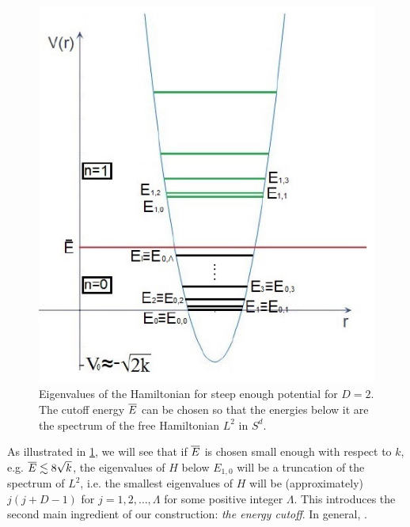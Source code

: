 \begin{figure}[h]
    \centering
    \includegraphics[width = \textwidth/2]{images/FioreEigenvalues.PNG}
    \caption{Eigenvalues of the Hamiltonian for steep enough potential for $D = 2$. The cutoff energy $\overline{E}$ can be chosen so that the energies below it are the spectrum of the free Hamiltonian $L^2$ in $S^d$.}
    \label{fig:D2EigenvaluesEigenEnergiesHarmonicCutoff}
\end{figure}

As illustrated in \ref{fig:D2EigenvaluesEigenEnergiesHarmonicCutoff}, we will see that if $\overline{E}$ is chosen small enough with respect to $k$, e.g. $\overline{E} \lesssim 8\sqrt{k}$, the eigenvalues of $H$ below $E_{1,0}$ will be a truncation of the spectrum of $L^2$, i.e. the smallest eigenvalues of $H$ will be (approximately) $j(j+D-1)$ for $j = 1, 2, \dots, \Lambda$ for some positive integer $\Lambda$. This introduces the second main ingredient of our construction: \textit{the energy cutoff}. In general, . 

